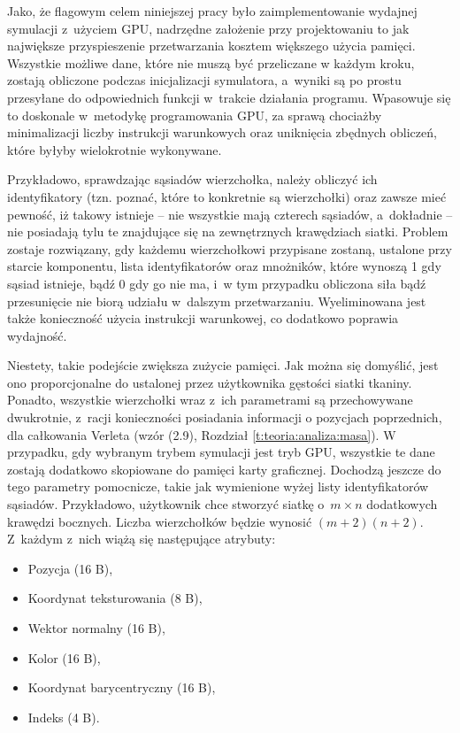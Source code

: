 	Jako, że flagowym celem niniejszej pracy było zaimplementowanie wydajnej symulacji z~użyciem GPU, nadrzędne założenie przy projektowaniu to jak największe przyspieszenie przetwarzania kosztem większego użycia pamięci. Wszystkie możliwe dane, które nie muszą być przeliczane w każdym kroku, zostają obliczone podczas inicjalizacji symulatora, a~wyniki są po prostu przesyłane do odpowiednich funkcji w~trakcie działania programu. Wpasowuje się to doskonale w~metodykę programowania GPU, za sprawą chociażby minimalizacji liczby instrukcji warunkowych oraz uniknięcia zbędnych obliczeń, które byłyby wielokrotnie wykonywane.
	
	Przykładowo, sprawdzając sąsiadów wierzchołka, należy obliczyć ich identyfikatory (tzn. poznać, które to konkretnie są wierzchołki) oraz zawsze mieć pewność, iż takowy istnieje -- nie wszystkie mają czterech sąsiadów, a~dokładnie -- nie posiadają tylu te znajdujące się na zewnętrznych krawędziach siatki. Problem zostaje rozwiązany, gdy każdemu wierzchołkowi przypisane zostaną, ustalone przy starcie komponentu, lista identyfikatorów oraz mnożników, które wynoszą 1 gdy sąsiad istnieje, bądź 0 gdy go nie ma, i~w tym przypadku obliczona siła bądź przesunięcie nie biorą udziału w~dalszym przetwarzaniu. Wyeliminowana jest także konieczność użycia instrukcji warunkowej, co dodatkowo poprawia wydajność. 
	
	Niestety, takie podejście zwiększa zużycie pamięci. Jak można się domyślić, jest ono proporcjonalne do ustalonej przez użytkownika gęstości siatki tkaniny. Ponadto, wszystkie wierzchołki wraz z~ich parametrami są przechowywane dwukrotnie, z~racji konieczności posiadania informacji o pozycjach poprzednich, dla całkowania Verleta (wzór (2.9), Rozdział \ref{t:teoria:analiza:masa}). W przypadku, gdy wybranym trybem symulacji jest tryb GPU, wszystkie te dane zostają dodatkowo skopiowane do pamięci karty graficznej. Dochodzą jeszcze do tego parametry pomocnicze, takie jak wymienione wyżej listy identyfikatorów sąsiadów. Przykładowo, użytkownik chce stworzyć siatkę o~\(m \times n\) dodatkowych krawędzi bocznych. Liczba wierzchołków będzie wynosić \( (m + 2)(n + 2) \). Z~każdym z~nich wiążą się następujące atrybuty:
	
	\begin{itemize}
		\item Pozycja (16 B),
		\item Koordynat teksturowania (8 B),
		\item Wektor normalny (16 B),
		\item Kolor (16 B),
		\item Koordynat barycentryczny (16 B),
		\item Indeks (4 B).
	\end{itemize}
	
